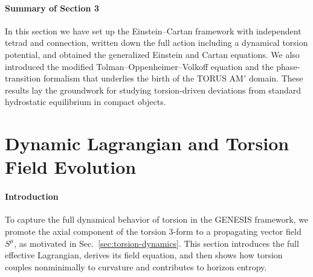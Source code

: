 \documentclass{article}
\begin{document}
\paragraph{Summary of Section 3}
In this section we have set up the Einstein–Cartan framework with independent tetrad and connection, written down the full action including a dynamical torsion potential, and obtained the generalized Einstein and Cartan equations.  We also introduced the modified Tolman–Oppenheimer–Volkoff equation and the phase-transition formalism that underlies the birth of the TORUS AM$'$ domain.  These results lay the groundwork for studying torsion-driven deviations from standard hydrostatic equilibrium in compact objects.

\medskip
\begin{center}
\end{center}
\medskip








\section{Dynamic Lagrangian and Torsion Field Evolution}
\label{sec:dynamic-lagrangian}

\paragraph{Introduction}
To capture the full dynamical behavior of torsion in the GENESIS framework, we promote the axial component of the torsion 3-form to a propagating vector field \(S^\mu\), as motivated in Sec.~\ref{sec:torsion-dynamics}. This section introduces the full effective Lagrangian, derives its field equation, and then shows how torsion couples nonminimally to curvature and contributes to horizon entropy.
\end{document}
